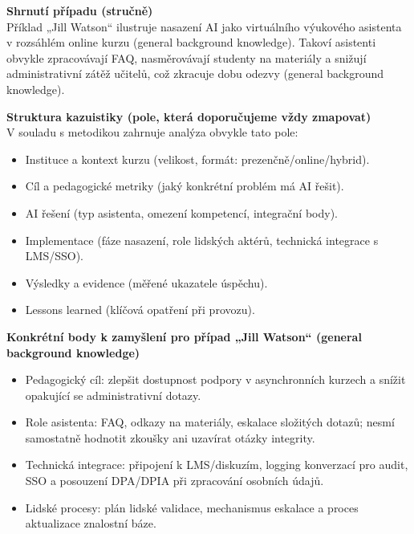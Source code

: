 \medskip

\textbf{Shrnutí případu (stručně)}\\
Příklad „Jill Watson“ ilustruje nasazení AI jako virtuálního výukového asistenta v rozsáhlém online kurzu (general background knowledge). Takoví asistenti obvykle zpracovávají FAQ, nasměrovávají studenty na materiály a snižují administrativní zátěž učitelů, což zkracuje dobu odezvy (general background knowledge).

\bigskip
\textbf{Struktura kazuistiky (pole, která doporučujeme vždy zmapovat)}\\
V souladu s metodikou zahrnuje analýza obvykle tato pole:
\begin{itemize}
  \item Instituce a kontext kurzu (velikost, formát: prezenčně/online/hybrid).
  \item Cíl a pedagogické metriky (jaký konkrétní problém má AI řešit).
  \item AI řešení (typ asistenta, omezení kompetencí, integrační body).
  \item Implementace (fáze nasazení, role lidských aktérů, technická integrace s LMS/SSO).
  \item Výsledky a evidence (měřené ukazatele úspěchu).
  \item Lessons learned (klíčová opatření při provozu).
\end{itemize}

\bigskip
\textbf{Konkrétní body k zamyšlení pro případ „Jill Watson“ (general background knowledge)}\\
\begin{itemize}
  \item Pedagogický cíl: zlepšit dostupnost podpory v asynchronních kurzech a snížit opakující se administrativní dotazy.
  \item Role asistenta: FAQ, odkazy na materiály, eskalace složitých dotazů; nesmí samostatně hodnotit zkoušky ani uzavírat otázky integrity.
  \item Technická integrace: připojení k LMS/diskuzím, logging konverzací pro audit, SSO a posouzení DPA/DPIA při zpracování osobních údajů.
  \item Lidské procesy: plán lidské validace, mechanismus eskalace a proces aktualizace znalostní báze.
\end{itemize}

